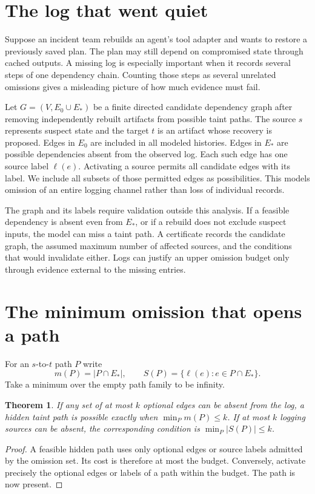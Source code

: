 \documentclass[11pt]{article}
\newtheorem{theorem}{Theorem}
\begin{document}
\section{The log that went quiet}
Suppose an incident team rebuilds an agent's tool adapter and wants
to restore a previously saved plan. The plan may still depend on
compromised state through cached outputs. A missing log is especially
important when it records several steps of one dependency chain.
Counting those steps as several unrelated omissions gives a
misleading picture of how much evidence must fail.

Let $G=(V,E_0\cup E_*)$ be a finite directed candidate dependency
graph after removing independently rebuilt artifacts from possible
taint paths. The source $s$ represents suspect state and the target
$t$ is an artifact whose recovery is proposed. Edges in $E_0$ are
included in all modeled histories. Edges in $E_*$ are possible
dependencies absent from the observed log. Each such edge has one
source label $\ell(e)$. Activating a source permits all candidate
edges with its label. We include all subsets of those permitted
edges as possibilities. This models omission of an entire logging
channel rather than loss of individual records.

The graph and its labels require validation outside this analysis.
If a feasible dependency is absent even from $E_*$, or if a
rebuild does not exclude suspect inputs, the model can miss a
taint path. A certificate records the candidate graph, the
assumed maximum number of affected sources, and the conditions
that would invalidate either. Logs can justify an upper omission
budget only through evidence external to the missing entries.

\section{The minimum omission that opens a path}
For an $s$-to-$t$ path $P$ write
\[
m(P)=|P\cap E_*|,\qquad
S(P)=\{\ell(e):e\in P\cap E_*\}.
\]
Take a minimum over the empty path family to be infinity.
\begin{theorem}
If any set of at most $k$ optional edges can be absent from the log,
a hidden taint path is possible exactly when
$\min_P m(P)\le k$. If at most $k$ logging sources can be absent,
the corresponding condition is $\min_P |S(P)|\le k$.
\end{theorem}
\begin{proof}
A feasible hidden path uses only optional edges or source labels
admitted by the omission set. Its cost is therefore at most the
budget. Conversely, activate precisely the optional edges or
labels of a path within the budget. The path is now present.
\end{proof}
\end{document}
